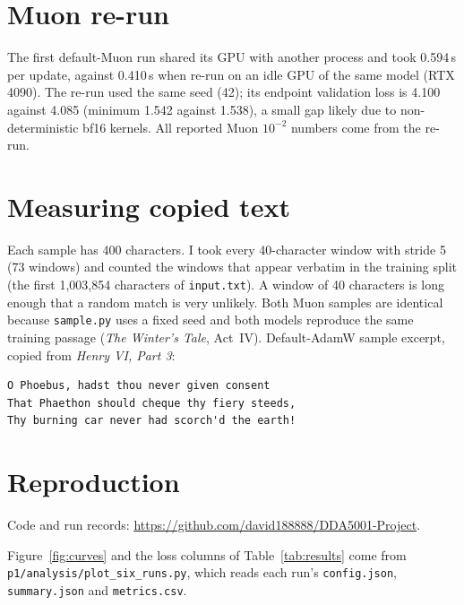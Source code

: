 \documentclass[10pt]{article}
\begin{document}
\section{Muon re-run}\label{app:time}
The first default-Muon run shared its GPU with another process and took 0.594\,s per update, against 0.410\,s when re-run on an idle GPU of the same model (RTX 4090). The re-run used the same seed (42); its endpoint validation loss is 4.100 against 4.085 (minimum 1.542 against 1.538), a small gap likely due to non-deterministic bf16 kernels. All reported Muon $10^{-2}$ numbers come from the re-run.

\section{Measuring copied text}\label{app:copy}
Each sample has 400 characters. I took every 40-character window with stride 5 (73 windows) and counted the windows that appear verbatim in the training split (the first 1,003,854 characters of \texttt{input.txt}). A window of 40 characters is long enough that a random match is very unlikely. Both Muon samples are identical because \texttt{sample.py} uses a fixed seed and both models reproduce the same training passage (\emph{The Winter's Tale}, Act~IV). Default-AdamW sample excerpt, copied from \emph{Henry VI, Part 3}:
{\small\begin{verbatim}
O Phoebus, hadst thou never given consent
That Phaethon should cheque thy fiery steeds,
Thy burning car never had scorch'd the earth!
\end{verbatim}}

\section{Reproduction}
Code and run records: \url{https://github.com/david188888/DDA5001-Project}.

Figure~\ref{fig:curves} and the loss columns of Table~\ref{tab:results} come from \texttt{p1/analysis/plot\_six\_runs.py}, which reads each run's \texttt{config.json}, \texttt{summary.json} and \texttt{metrics.csv}.
\end{document}
